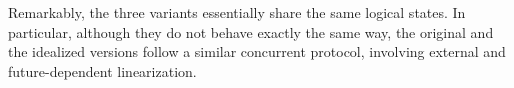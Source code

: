 Remarkably, the three variants essentially share the same logical states.
In particular, although they do not behave exactly the same way, the original and the idealized versions follow a similar concurrent protocol, involving external and future-dependent linearization.








